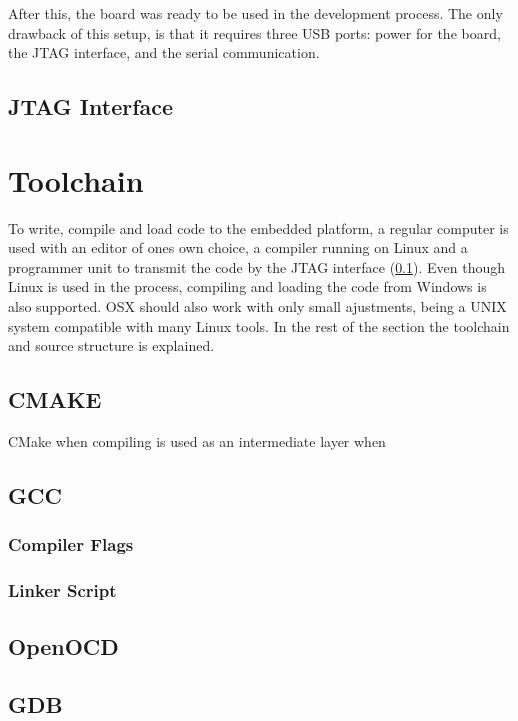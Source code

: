 After this, the board was ready to be used in the development process.
The only drawback of this setup, is that it requires three USB ports:
power for the board, the JTAG interface, and the serial communication.

\subsection{JTAG Interface}
\label{ssec:JTAG_Interface}


\section{Toolchain}
To write, compile and load code to the embedded platform, a regular computer is used with an editor of ones own choice, a compiler running on Linux and a programmer unit to transmit the code by the JTAG interface (\ref{ssec:JTAG_Interface}).
Even though Linux is used in the process, compiling and loading the code from Windows is also supported. OSX should also work with only small ajustments, being a UNIX system compatible with many Linux tools.
In the rest of the section the toolchain and source structure is explained.

\subsection{CMAKE}
CMake when compiling is used as an intermediate layer when

\subsection{GCC}

\subsubsection{Compiler Flags}

\subsubsection{Linker Script}

\subsection{OpenOCD}

\subsection{GDB}

